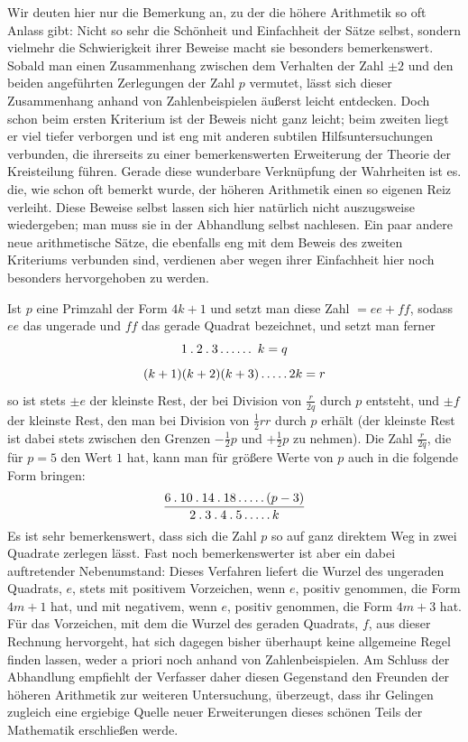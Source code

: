 Wir deuten hier nur die Bemerkung an, zu der die höhere Arithmetik so oft Anlass gibt: Nicht so sehr die Schönheit und Einfachheit der Sätze selbst, sondern vielmehr die Schwierigkeit ihrer Beweise macht sie besonders bemerkenswert. Sobald man einen Zusammenhang zwischen dem Verhalten der Zahl $\pm2$ und den beiden angeführten Zerlegungen der Zahl $p$ vermutet, lässt sich dieser Zusammenhang anhand von Zahlenbeispielen äußerst leicht entdecken. Doch schon beim ersten Kriterium ist der Beweis nicht ganz leicht; beim zweiten liegt er viel tiefer verborgen und ist eng mit anderen subtilen Hilfsuntersuchungen verbunden, die ihrerseits zu einer bemerkenswerten Erweiterung der Theorie der Kreisteilung führen. Gerade diese wunderbare Verknüpfung der Wahrheiten ist es. die, wie schon oft bemerkt wurde, der höheren Arithmetik einen so eigenen Reiz verleiht. Diese Beweise selbst lassen sich hier natürlich nicht auszugsweise wiedergeben; man muss sie in der Abhandlung selbst nachlesen. Ein paar andere neue arithmetische Sätze, die ebenfalls eng mit dem Beweis des zweiten Kriteriums verbunden sind, verdienen aber wegen ihrer Einfachheit hier noch besonders hervorgehoben zu werden.

Ist $p$ eine Primzahl der Form $4k+1$ und setzt man diese Zahl $=ee+ff$,
%
sodass $ee$ das ungerade und $ff$ das gerade Quadrat bezeichnet, und setzt man ferner
\[
1\pdot2\pdot3\mathinner{.\,.\,.\,.\,.\,.}\ k=q
\]
\[
(k+1)(k+2)(k+3)\mathinner{.\,.\,.\,.\,.}2k=r
\]
so ist stets $\pm e$ der kleinste Rest, der bei Division von $\frac r{2q}$ durch $p$ entsteht, und $\pm f$ der kleinste Rest, den man bei Division von $\frac12rr$ durch $p$ erhält (der kleinste Rest ist dabei stets zwischen den Grenzen $-\frac12p$ und $+\frac12p$ zu nehmen). Die Zahl $\frac r{2q}$, die für $p=5$ den Wert $1$ hat, kann man für größere Werte von $p$ auch in die folgende Form bringen:
\[
\frac{6\mathbin{.}10\mathbin{.}14\mathbin{.}18\mathinner{.\,.\,.\,.\,.}(p-3)}{2\mathbin{.}3\mathbin{.}4\mathbin{.}5\mathinner{.\,.\,.\,.\,.} k}
\]
Es ist sehr bemerkenswert, dass sich die Zahl $p$ so auf ganz direktem Weg in zwei Quadrate zerlegen lässt. Fast noch bemerkenswerter ist aber ein dabei auftretender Nebenumstand: Dieses Verfahren liefert die Wurzel des ungeraden Quadrats, $e$, stets mit positivem Vorzeichen, wenn $e$, positiv genommen, die Form $4m+1$ hat, und mit negativem, wenn $e$, positiv genommen, die Form $4m+3$ hat. Für das Vorzeichen, mit dem die Wurzel des geraden Quadrats, $f$, aus dieser Rechnung hervorgeht, hat sich dagegen bisher überhaupt keine allgemeine Regel finden lassen, weder a priori noch anhand von Zahlenbeispielen. Am Schluss der Abhandlung empfiehlt der Verfasser daher diesen Gegenstand den Freunden der höheren Arithmetik zur weiteren Untersuchung, überzeugt, dass ihr Gelingen zugleich eine ergiebige Quelle neuer Erweiterungen dieses schönen Teils der Mathematik erschließen werde.
